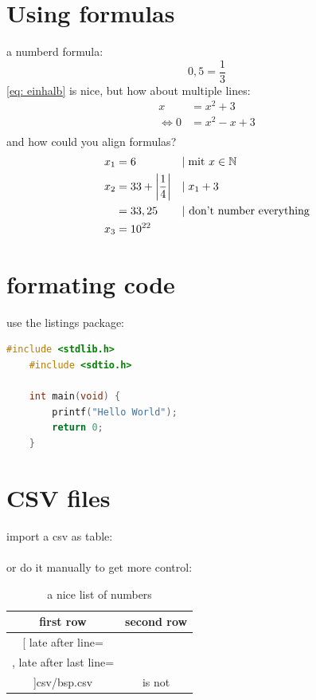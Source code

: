 \documentclass[	%
		11pt,a4paper,	%
		twoside,		%
		english,		%
		f1				%
	]{HsH-report}		%
\begin{document}
\section{Using formulas}
	\label{sec: formula}
	a numberd formula:
	\begin{equation}
		\label{eq: einhalb} %
		0,5=\frac{1}{3}
	\end{equation}
	\autoref{eq: einhalb} is nice, but how about multiple lines:
	\begin{equation}
	\begin{split} %
		x &= x^2+3 \\
		\Leftrightarrow 0 &= x^2-x+3 \\
	\end{split}
	\end{equation}
	and how could you align formulas?
	\begin{align}
		x_1 &= 6 &&|\;\mbox{mit } x \in \mathbb{N} \\
		x_2 &= 33+\left\vert\frac{1}{4}\right\vert &&|\;x_1+3 \\
			&= 33,25 &&\mbox{| don't number everything} \notag \\
		x_3 &= 10^{22}
	\end{align}

\section{formating code}
	\label{sec: code}
	use the listings package:
	\begin{lstlisting}[language=c]
	#include <stdlib.h>
	#include <sdtio.h>

	int main(void) {
		printf("Hello World");
		return 0;
	}
	\end{lstlisting}

\section{CSV files}
	\label{sec: messwerte}
	import a csv as table:\\
	\\
	or do it manually to get more control:
	\begin{table}
		\caption{a nice list of numbers}
		\begin{tabular}{c|c}
			first row & second row \\\hline\hline
			\csvreader[
				late after line=\\\hline,
				late after last line=\\\hline
			]{csv/bsp.csv}{}{number: $\csvcoli\,\metre$ & is not \csvcoliii}
		\end{tabular}
	\end{table}
\end{document}
